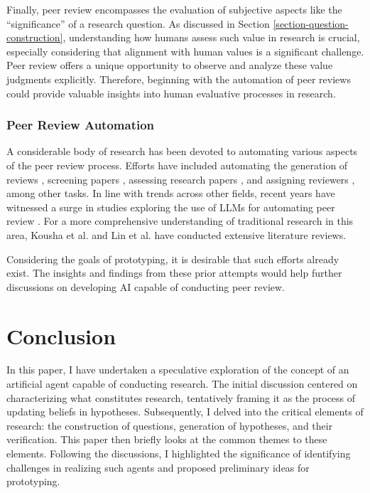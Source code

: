 \documentclass{article}
\begin{document}
Finally, peer review encompasses the evaluation of subjective aspects like the ``significance'' of a research question. As discussed in Section \ref{section-question-construction}, understanding how humans assess such value in research is crucial, especially considering that alignment with human values is a significant challenge. Peer review offers a unique opportunity to observe and analyze these value judgments explicitly. Therefore, beginning with the automation of peer reviews could provide valuable insights into human evaluative processes in research.

\subsubsection{Peer Review Automation}

A considerable body of research has been devoted to automating various aspects of the peer review process. Efforts have included automating the generation of reviews \cite{yuan2022can,yuan2022kid,wang2020reviewrobot}, screening papers \cite{schulz2022future}, assessing research papers \cite{kousha2022artificial}, and assigning reviewers \cite{zhao2022reviewer}, among other tasks. In line with trends across other fields, recent years have witnessed a surge in studies exploring the use of LLMs for automating peer review \cite{wexin2023can,liu2023reviewergpt,robertson2023gpt4,hosseini2023fighting}. For a more comprehensive understanding of traditional research in this area, Kousha et al. \cite{kousha2022artificial} and Lin et al. \cite{lin2021automated1} have conducted extensive literature reviews.

Considering the goals of prototyping, it is desirable that such efforts already exist. The insights and findings from these prior attempts would help further discussions on developing AI capable of conducting peer review. 

\section{Conclusion}
In this paper, I have undertaken a speculative exploration of the concept of an artificial agent capable of conducting research. The initial discussion centered on characterizing what constitutes research, tentatively framing it as the process of updating beliefs in hypotheses. Subsequently, I delved into the critical elements of research: the construction of questions, generation of hypotheses, and their verification. This paper then briefly looks at the common themes to these elements. Following the discussions, I highlighted the significance of identifying challenges in realizing such agents and proposed preliminary ideas for prototyping.
\end{document}
